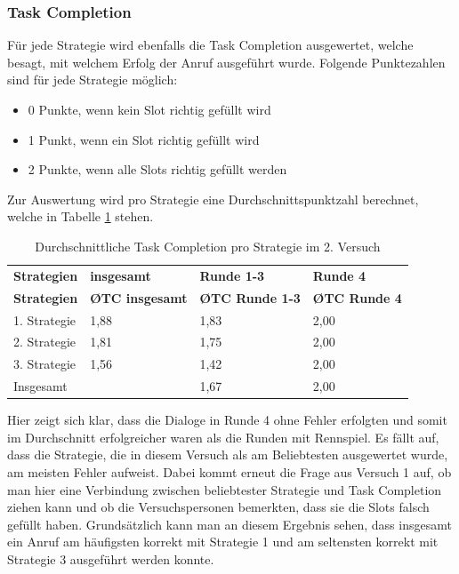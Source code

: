 \documentclass[12pt,a4paper]{scrartcl}
\begin{document}
\subsubsection{Task Completion}
\label{TC2}
Für jede Strategie wird ebenfalls die Task Completion ausgewertet, welche besagt, mit welchem Erfolg der Anruf ausgeführt wurde. Folgende Punktezahlen sind für jede Strategie möglich:
\begin{itemize}
\item 0 Punkte, wenn kein Slot richtig gefüllt wird
\item 1 Punkt, wenn ein Slot richtig gefüllt wird
\item 2 Punkte, wenn alle Slots richtig gefüllt werden
\end{itemize}
Zur Auswertung wird pro Strategie eine Durchschnittspunktzahl berechnet, welche in Tabelle \ref{TCV2} stehen. 

\begin{longtable}{p{3cm}p{3cm}p{3cm}p{3cm} }
	\label{TCV2}\\
		\caption[Durchschnittliche Task Completion pro Strategie im 2. Versuch]{Durchschnittliche Task Completion pro Strategie im 2. Versuch}\\
	\hline
\textbf{Strategien}&\textbf{insgesamt}&\textbf{Runde 1-3} &\textbf{Runde 4}\\
	\hline
	\endfirsthead
	\hline
	\textbf{Strategien}&\textbf{\O TC insgesamt}&\textbf{\O TC Runde 1-3} &\textbf{\O TC Runde 4}\\
	\hline
	\endhead
1. Strategie & 1,88 & 1,83 & 2,00  \\
2. Strategie & 1,81 & 1,75 & 2,00  \\
3. Strategie & 1,56 & 1,42 & 2,00  \\
Insgesamt & & 1,67 & 2,00 \\ 
\hline
\end{longtable}

Hier zeigt sich klar, dass die Dialoge in Runde 4 ohne Fehler erfolgten und somit im Durchschnitt erfolgreicher waren als die Runden mit Rennspiel. Es fällt auf, dass die Strategie, die in diesem Versuch als am Beliebtesten ausgewertet wurde, am meisten Fehler aufweist. Dabei kommt erneut die Frage aus Versuch 1 auf, ob man hier eine Verbindung zwischen beliebtester Strategie und Task Completion ziehen kann und ob die Versuchspersonen bemerkten, dass sie die Slots falsch gefüllt haben. 
Grundsätzlich kann man an diesem Ergebnis sehen, dass insgesamt ein Anruf am häufigsten korrekt mit Strategie 1 und am seltensten korrekt mit Strategie 3 ausgeführt werden konnte. 
\end{document}
